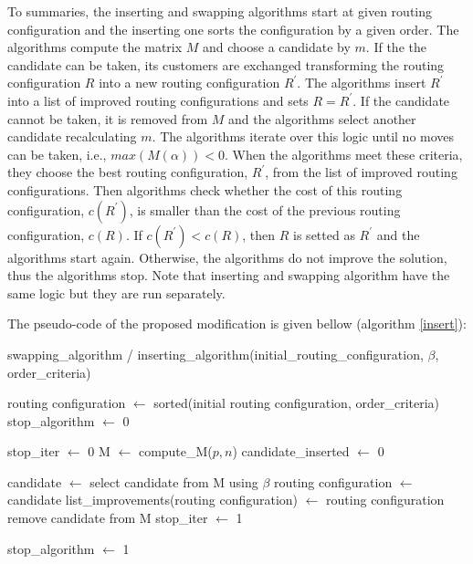 To summaries, the inserting and swapping algorithms start at given routing configuration and the inserting one sorts the configuration by a given order. The algorithms compute the matrix $M$ and choose a candidate by $m$. If the the candidate can be taken, its customers are exchanged transforming the routing configuration $R$ into a new routing configuration $R^{'}$. The algorithms insert $R^{'}$ into a list of improved routing configurations and sets $R = R^{'}$. If the candidate cannot be taken, it is removed from $M$ and the algorithms select another candidate recalculating $m$. The algorithms iterate over this logic until no moves can be taken, i.e., $max(M(\alpha))<0$. When the algorithms meet these criteria, they choose the best routing configuration, $R^{'}$, from the list of improved routing configurations. Then algorithms check whether the cost of this routing configuration, $c(R^{'})$, is smaller than the cost of the previous routing configuration, $c(R)$. If $c(R^{'}) < c(R)$, then $R$ is setted as $R^{'}$ and the algorithms start again. Otherwise, the algorithms do not improve the solution, thus the algorithms stop. Note that inserting and swapping algorithm have the same logic but they are run separately.

The pseudo-code of the proposed modification is given bellow (algorithm \ref{insert}):

\begin{algorithm}[H]
\caption{swapping\_algorithm / inserting\_algorithm(initial\_routing\_configuration, $ \beta$, order\_criteria) }
\label{insert}
\begin{algorithmic}[1]
	
	\STATE routing configuration $\leftarrow$ sorted(initial routing configuration, order\_criteria) 													  
	\STATE stop\_algorithm  $\leftarrow$ 0
	
	\STATE stop\_iter  $\leftarrow$ 0
	\STATE M  $\leftarrow$ compute\_M($p,n$)
	\STATE candidate\_inserted  $\leftarrow$ 0
	
	\STATE candidate $\leftarrow$ select candidate from M using $\beta$
	\STATE routing configuration  $\leftarrow$  candidate
	\STATE list\_improvements(routing configuration)  $\leftarrow$  routing configuration
	\ELSE
	\STATE remove candidate from M
	\ENDIF
	\STATE stop\_iter  $\leftarrow$ 1	    
	\ENDIF
	\ENDWHILE
	
	\STATE stop\_algorithm  $\leftarrow$ 1
	\ENDIF
	
	\ENDWHILE
	\ENDWHILE
	
\end{algorithmic}

\end{algorithm}

